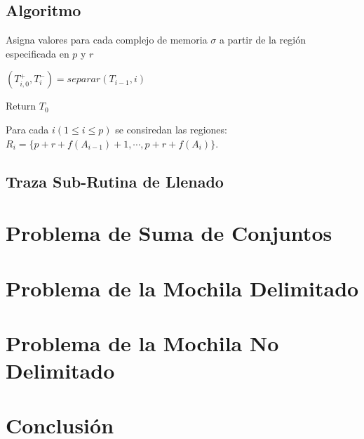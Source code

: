 \documentclass[12pt, letterpaper, twoside]{article}
\begin{document}
   \subsection{Algoritmo}
    \begin{algorithm}
        \caption{Asigna valores para cada complejo de memoria $\sigma$ a partir de la región especificada en $p$ y $r$}
        \label{ParallelFill}
        \begin{algorithmic}[1]
                \State $(T^+_{i,0}, T^-_i) = separar(T_{i-1}, i)$

                \EndFor
            \EndFor
            \State Return $T_0$
            \EndProcedure
        \end{algorithmic}
    \end{algorithm}
    \par Para cada $i (1\leq i \leq p)$ se consiredan las regiones:\\ $R_i=\{p+r+f(A_{i-1})+1,\cdots,p+r+f(A_i)\}$.
   \subsection{Traza Sub-Rutina de Llenado}
    \section{Problema de Suma de Conjuntos}
    \section{Problema de la Mochila Delimitado}
    \section{Problema de la Mochila No Delimitado}
    \section{Conclusión}

    
    \newpage
    \printbibliography
\end{document}
